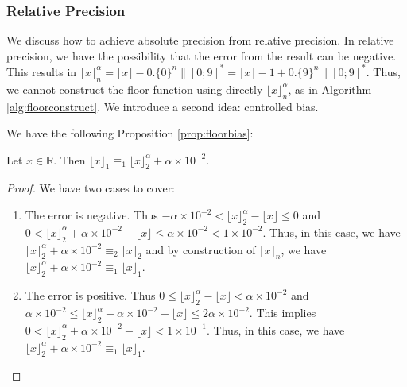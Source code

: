 \documentclass[runningheads]{llncs}
\begin{document}
\subsubsection{Relative Precision}
We discuss how to achieve absolute precision from relative precision. In relative precision, we have the possibility that the error from the result can be negative. This results in $\lfloor x \rfloor_n^\alpha = \lfloor x \rfloor - 0.\{0\}^{n}\|[0;9]^*=\lfloor x \rfloor-1 + 0.\{9\}^{n}\|[0;9]^* $. Thus, we cannot construct the floor function using directly $\lfloor x \rfloor_n^\alpha$, as in Algorithm \ref{alg:floorconstruct}. We introduce a second idea: controlled bias.

\medskip

\noindent We have the following Proposition \ref{prop:floorbias}:
\begin{proposition}\label{prop:floorbias}
  Let $x\in\mathbb{R}$. Then $\lfloor x\rfloor_1 \equiv_1 \lfloor x \rfloor_2^\alpha + \alpha\times10^{-2}$.
\end{proposition}
\begin{proof}
  We have two cases to cover: \begin{enumerate}
    \item The error is negative. Thus $-\alpha\times 10^{-2} < \lfloor x \rfloor_2^\alpha - \lfloor x \rfloor \leq 0$ and $0 < \lfloor x \rfloor_2^\alpha + \alpha\times 10^{-2} - \lfloor x \rfloor \leq \alpha\times 10^{-2} < 1\times 10^{-2}$. Thus, in this case, we have $\lfloor x \rfloor_2^\alpha + \alpha\times 10^{-2} \equiv_2 \lfloor x \rfloor_2$ and by construction of $\lfloor x \rfloor_n$, we have $\lfloor x \rfloor_2^\alpha + \alpha\times 10^{-2} \equiv_1 \lfloor x \rfloor_1$.
    \item The error is positive. Thus $0 \leq \lfloor x \rfloor_2^\alpha - \lfloor x \rfloor < \alpha\times10^{-2}$ and $\alpha\times10^{-2} \leq \lfloor x \rfloor_2^\alpha + \alpha\times 10^{-2} - \lfloor x \rfloor \leq 2\alpha\times 10^{-2}$. This implies $0<\lfloor x \rfloor_2^\alpha + \alpha\times 10^{-2} - \lfloor x \rfloor<1\times10^{-1}$. Thus, in this case, we have $\lfloor x \rfloor_2^\alpha + \alpha\times 10^{-2} \equiv_1 \lfloor x \rfloor_1$.
  \end{enumerate}
\end{proof}
\end{document}
